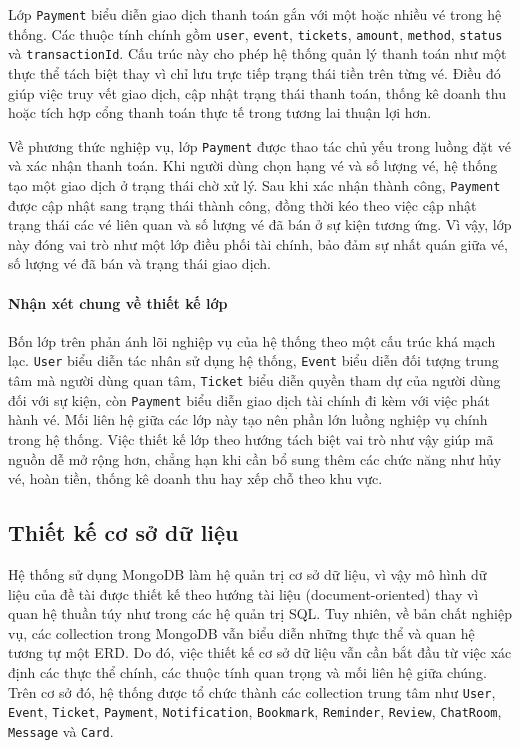 \documentclass[../DoAn.tex]{subfiles}
\begin{document}
Lớp \texttt{Payment} biểu diễn giao dịch thanh toán gắn với một hoặc nhiều vé trong hệ thống. Các thuộc tính chính gồm \texttt{user}, \texttt{event}, \texttt{tickets}, \texttt{amount}, \texttt{method}, \texttt{status} và \texttt{transactionId}. Cấu trúc này cho phép hệ thống quản lý thanh toán như một thực thể tách biệt thay vì chỉ lưu trực tiếp trạng thái tiền trên từng vé. Điều đó giúp việc truy vết giao dịch, cập nhật trạng thái thanh toán, thống kê doanh thu hoặc tích hợp cổng thanh toán thực tế trong tương lai thuận lợi hơn.

Về phương thức nghiệp vụ, lớp \texttt{Payment} được thao tác chủ yếu trong luồng đặt vé và xác nhận thanh toán. Khi người dùng chọn hạng vé và số lượng vé, hệ thống tạo một giao dịch ở trạng thái chờ xử lý. Sau khi xác nhận thành công, \texttt{Payment} được cập nhật sang trạng thái thành công, đồng thời kéo theo việc cập nhật trạng thái các vé liên quan và số lượng vé đã bán ở sự kiện tương ứng. Vì vậy, lớp này đóng vai trò như một lớp điều phối tài chính, bảo đảm sự nhất quán giữa vé, số lượng vé đã bán và trạng thái giao dịch.

\paragraph{Nhận xét chung về thiết kế lớp}\mbox{}

Bốn lớp trên phản ánh lõi nghiệp vụ của hệ thống theo một cấu trúc khá mạch lạc. \texttt{User} biểu diễn tác nhân sử dụng hệ thống, \texttt{Event} biểu diễn đối tượng trung tâm mà người dùng quan tâm, \texttt{Ticket} biểu diễn quyền tham dự của người dùng đối với sự kiện, còn \texttt{Payment} biểu diễn giao dịch tài chính đi kèm với việc phát hành vé. Mối liên hệ giữa các lớp này tạo nên phần lớn luồng nghiệp vụ chính trong hệ thống. Việc thiết kế lớp theo hướng tách biệt vai trò như vậy giúp mã nguồn dễ mở rộng hơn, chẳng hạn khi cần bổ sung thêm các chức năng như hủy vé, hoàn tiền, thống kê doanh thu hay xếp chỗ theo khu vực.

\subsection{Thiết kế cơ sở dữ liệu}
Hệ thống sử dụng MongoDB làm hệ quản trị cơ sở dữ liệu, vì vậy mô hình dữ liệu của đề tài được thiết kế theo hướng tài liệu (document-oriented) thay vì quan hệ thuần túy như trong các hệ quản trị \gls{SQL}. Tuy nhiên, về bản chất nghiệp vụ, các collection trong MongoDB vẫn biểu diễn những thực thể và quan hệ tương tự một \gls{ERD}. Do đó, việc thiết kế cơ sở dữ liệu vẫn cần bắt đầu từ việc xác định các thực thể chính, các thuộc tính quan trọng và mối liên hệ giữa chúng. Trên cơ sở đó, hệ thống được tổ chức thành các collection trung tâm như \texttt{User}, \texttt{Event}, \texttt{Ticket}, \texttt{Payment}, \texttt{Notification}, \texttt{Bookmark}, \texttt{Reminder}, \texttt{Review}, \texttt{ChatRoom}, \texttt{Message} và \texttt{Card}.
\end{document}

